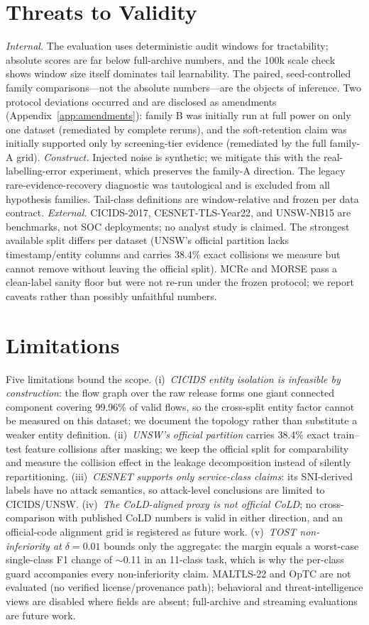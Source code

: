 \documentclass[pdflatex,referee,lineno,sn-basic,Numbered]{sn-jnl}
\begin{document}
\section{Threats to Validity}
\label{sec:threats}
\emph{Internal.} The evaluation uses deterministic audit windows for
tractability; absolute scores are far below full-archive numbers, and the 100k
scale check shows window size itself dominates tail learnability. The paired,
seed-controlled family comparisons---not the absolute numbers---are the objects
of inference. Two protocol deviations occurred and are disclosed as amendments
(Appendix~\ref{app:amendments}): family B was initially run at full power on
only one dataset (remediated by complete reruns), and the soft-retention claim
was initially supported only by screening-tier evidence (remediated by the
full family-A grid).
\emph{Construct.} Injected noise is synthetic; we mitigate this with the
real-labelling-error experiment, which preserves the family-A direction. The
legacy rare-evidence-recovery diagnostic was tautological and is excluded from
all hypothesis families. Tail-class definitions are window-relative and frozen
per data contract.
\emph{External.} CICIDS-2017, CESNET-TLS-Year22, and UNSW-NB15 are benchmarks,
not SOC deployments; no analyst study is claimed. The strongest available
split differs per dataset (UNSW's official partition lacks timestamp/entity
columns and carries 38.4\% exact collisions we measure but cannot remove
without leaving the official split). MCRe and MORSE pass a clean-label sanity
floor but were not re-run under the frozen protocol; we report caveats rather
than possibly unfaithful numbers.

\section{Limitations}
\label{sec:limits}
Five limitations bound the scope. (i)~\emph{CICIDS entity isolation is
infeasible by construction}: the flow graph over the raw release forms one
giant connected component covering 99.96\% of valid flows, so the cross-split
entity factor cannot be measured on this dataset; we document the topology
rather than substitute a weaker entity definition. (ii)~\emph{UNSW's official
partition} carries 38.4\% exact train--test feature collisions after masking;
we keep the official split for comparability and measure the collision effect
in the leakage decomposition instead of silently repartitioning.
(iii)~\emph{CESNET supports only service-class claims}: its SNI-derived labels
have no attack semantics, so attack-level conclusions are limited to
CICIDS/UNSW. (iv)~\emph{The CoLD-aligned proxy is not official CoLD}; no
cross-comparison with published CoLD numbers is valid in either direction, and
an official-code alignment grid is registered as future work.
(v)~\emph{TOST non-inferiority at $\delta{=}0.01$} bounds only the aggregate:
the margin equals a worst-case single-class F1 change of $\sim$0.11 in an
11-class task, which is why the per-class guard accompanies every
non-inferiority claim. MALTLS-22 and OpTC are not evaluated (no verified
license/provenance path); behavioral and threat-intelligence views are
disabled where fields are absent; full-archive and streaming evaluations are
future work.
\end{document}
